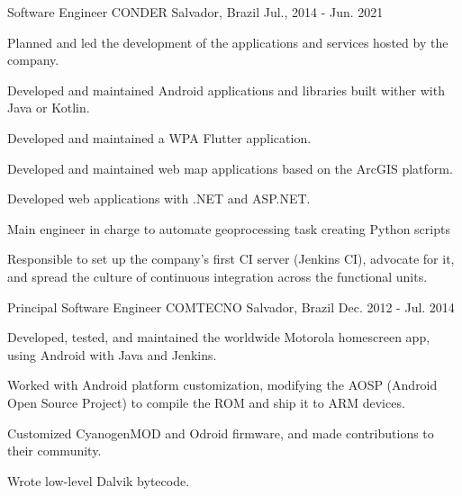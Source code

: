 \begin{cventries}
  \cventry
    {Software Engineer} %
    {CONDER} %
    {Salvador, Brazil} %
    {Jul., 2014 - Jun. 2021} %
    {
      \begin{cvitems} %
        \item {Planned and led the development of the applications and services hosted by the company.}
        \item {Developed and maintained Android applications and libraries built wither with Java or Kotlin.}
        \item {Developed and maintained a WPA Flutter application.}
        \item {Developed and maintained web map applications based on the ArcGIS platform.}
        \item {Developed web applications with .NET and ASP.NET.}
        \item {Main engineer in charge to automate geoprocessing task creating Python scripts}
        \item {Responsible to set up the company's first CI server (Jenkins CI), advocate for it, and spread the culture of continuous integration across the functional units.}
      \end{cvitems}
    }

  \cventry
    {Principal Software Engineer} %
    {COMTECNO} %
    {Salvador, Brazil} %
    {Dec. 2012 - Jul. 2014} %
    {
      \begin{cvitems} %
        \item {Developed, tested, and maintained the worldwide Motorola homescreen app, using Android with Java and Jenkins.}
        \item {Worked with Android platform customization, modifying the AOSP (Android Open Source Project) to compile the ROM and ship it to ARM devices.}
        \item {Customized CyanogenMOD and Odroid firmware, and made contributions to their community.}
        \item {Wrote low-level Dalvik bytecode.}
      \end{cvitems}
    }


\end{cventries}
